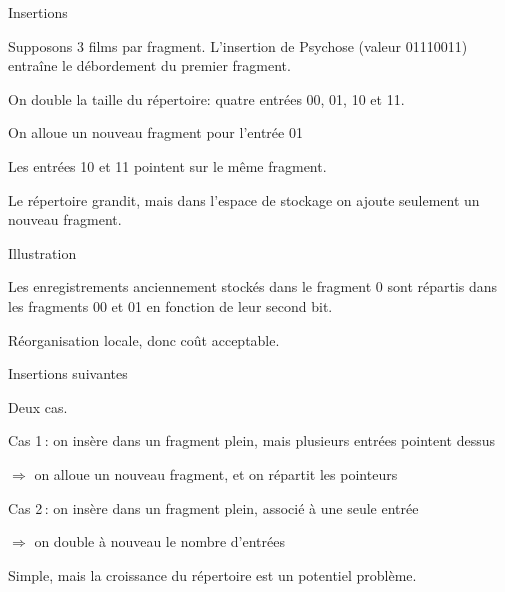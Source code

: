 \begin{frame}{Insertions}

Supposons 3 films par fragment. L'insertion de Psychose
(valeur 01110011) entraîne le débordement du premier fragment.

\vfill

\begin{redbullet}
  \item On double la taille du répertoire: quatre entrées 00, 01, 10 et 11.
  \item On alloue un nouveau fragment pour l'entrée 01
  \item Les entrées 10 et 11 pointent sur le \alert{même} fragment.
\end{redbullet}

\vfill

\begin{blocgauche}
Le répertoire grandit, mais dans l'espace de stockage on ajoute seulement
un nouveau fragment.
\end{blocgauche}


\end{frame}
\begin{frame}{Illustration}

Les enregistrements anciennement stockés dans le fragment 0 sont répartis
dans les fragments 00 et 01 en fonction de leur second bit.
\vfill


\vfill

Réorganisation \alert{locale}, donc coût acceptable.

\end{frame}
\begin{frame}{Insertions suivantes}

Deux cas.

\vfill

\alert{Cas 1}\,: on insère dans un fragment plein, mais plusieurs
           entrées pointent dessus
  
 $\Rightarrow$ on alloue un nouveau fragment, et on répartit les pointeurs

\vfill

\alert{Cas 2}\,:  on insère dans un fragment plein, associé à une seule entrée
 
     
 $\Rightarrow$ on double à nouveau le nombre d'entrées

\vfill

\begin{blocgauche}
Simple, mais la croissance du  répertoire est un potentiel problème.
\end{blocgauche}

\end{frame}
